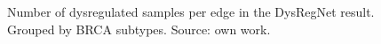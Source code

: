 \documentclass[pdftex,12pt,a4paper]{report}
\begin{document}
\begin{figure}[!ht]
\begin{center}
	\caption{Number of dysregulated samples per edge in the DysRegNet result. Grouped by BRCA subtypes. Source: own work.}
	\label{samples_per_edge}
\end{center}
\end{figure}
\end{document}
